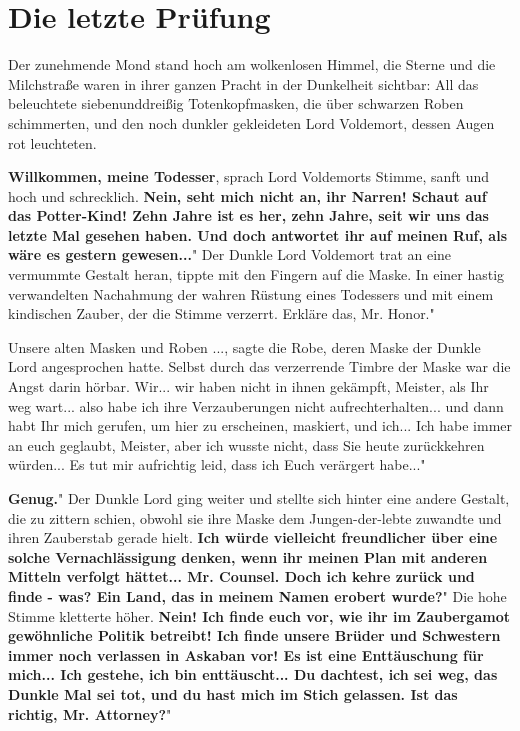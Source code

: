\chapter{Die letzte Prüfung}

Der zunehmende Mond stand hoch am wolkenlosen Himmel, die Sterne und die
Milchstraße waren in ihrer ganzen Pracht in der Dunkelheit sichtbar: All das
beleuchtete siebenunddreißig Totenkopfmasken, die über schwarzen Roben
schimmerten, und den noch dunkler gekleideten Lord Voldemort, dessen Augen rot
leuchteten.

\glqq{}\textbf{Willkommen, meine Todesser}\grqq{}, sprach Lord Voldemorts Stimme,
sanft und hoch und schrecklich. \glqq{}\textbf{Nein, seht mich nicht an, ihr
Narren! Schaut auf das Potter-Kind! Zehn Jahre ist es her, zehn Jahre, seit wir
uns das letzte Mal gesehen haben. Und doch antwortet ihr auf meinen Ruf, als
wäre es gestern gewesen...}" Der Dunkle Lord Voldemort trat an eine vermummte
Gestalt heran, tippte mit den Fingern auf die Maske. \glqq{}In einer hastig
verwandelten Nachahmung der wahren Rüstung eines Todessers und mit einem
kindischen Zauber, der die Stimme verzerrt. Erkläre das, Mr. Honor."

\glqq{}Unsere alten Masken und Roben ...\grqq{}, sagte die Robe, deren Maske der
Dunkle Lord angesprochen hatte. Selbst durch das verzerrende Timbre der Maske
war die Angst darin hörbar. \glqq{}Wir... wir haben nicht in ihnen gekämpft,
Meister, als Ihr weg wart... also habe ich ihre Verzauberungen nicht
aufrechterhalten... und dann habt Ihr mich gerufen, um hier zu erscheinen,
maskiert, und ich... Ich habe immer an euch geglaubt, Meister, aber ich wusste
nicht, dass Sie heute zurückkehren würden... Es tut mir aufrichtig leid, dass
ich Euch verärgert habe..."

\glqq{}\textbf{Genug.}" Der Dunkle Lord ging weiter und stellte sich hinter eine
andere Gestalt, die zu zittern schien, obwohl sie ihre Maske dem
Jungen-der-lebte zuwandte und ihren Zauberstab gerade hielt. \glqq{}\textbf{Ich
würde vielleicht freundlicher über eine solche Vernachlässigung denken, wenn ihr
meinen Plan mit anderen Mitteln verfolgt hättet... Mr. Counsel. Doch ich kehre
zurück und finde - was? Ein Land, das in meinem Namen erobert wurde?}" Die hohe
Stimme kletterte höher. \glqq{}\textbf{Nein! Ich finde euch vor, wie ihr im
Zaubergamot gewöhnliche Politik betreibt! Ich finde unsere Brüder und Schwestern
immer noch verlassen in Askaban vor! Es ist eine Enttäuschung für mich... Ich
gestehe, ich bin enttäuscht... Du dachtest, ich sei weg, das Dunkle Mal sei tot,
und du hast mich im Stich gelassen. Ist das richtig, Mr. Attorney?}"

